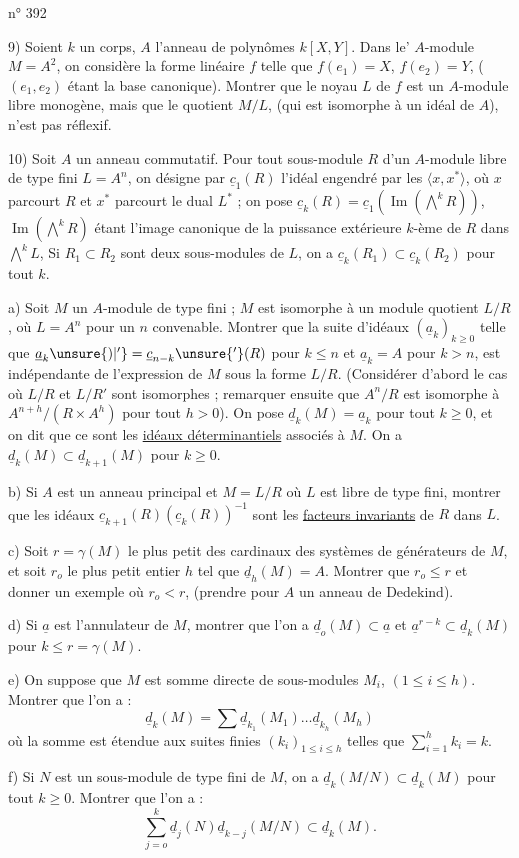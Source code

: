 \hfill n° 392

9) Soient $k$ un corps, $A$ l'anneau de polynômes $k[X,Y]$. Dans le' $A$-module $M=A^2$, on considère la forme linéaire $f$ telle que $f(e_1)=X$, $f(e_2)=Y$, ($(e_1,e_2)$ étant la base canonique). Montrer que le noyau $L$ de $f$ est un $A$-module libre monogène, mais que le quotient $M/L$, (qui est isomorphe à un idéal de $A$), n'est pas réflexif.

10) Soit $A$ un anneau commutatif. Pour tout sous-module $R$ d'un $A$-module libre de type fini $L=A^n$, on désigne par $\underline{c}_1(R)$ l'idéal engendré par les $\langle x,x^*\rangle$, où $x$ parcourt $R$ et $x^*$ parcourt le dual $L^*$ ; on pose $\underline{c}_k(R)=\underline{c}_1(\operatorname{Im}(\overset{k}{\bigwedge}R))$, $\operatorname{Im}(\overset{k}{\bigwedge}R)$ étant l'image canonique de la puissance extérieure $k$-ème de $R$ dans $\overset{k}{\bigwedge}L$, Si $R_1\subset R_2$ sont deux sous-modules de $L$, on a $\underline{c}_k(R_1)\subset \underline{c}_k(R_2)$ pour tout $k$.

a) Soit $M$ un $A$-module de type fini ; $M$ est isomorphe à un module quotient $L/R$, où $L=A^n$ pour un $n$ convenable. Montrer que la suite d'idéaux $(\underline{a}_k)_{k\geq0}$ telle que $\underline{a}_k\unsure{)|'}=\underline{c}_{n-k}\unsure{'}(R)$ pour $k\leq n$ et $\underline{a}_k=A$ pour $k>n$, est indépendante de l'expression de $M$ sous la forme $L/R$. (Considérer d'abord le cas où $L/R$ et $L/R'$ sont isomorphes ; remarquer ensuite que $A^n/R$ est isomorphe à $A^{n+h}/(R\times A^h)$ pour tout $h>0$). On pose $\underline{d}_k(M)=\underline{a}_k$ pour tout $k\geq0$, et on dit que ce sont les \uline{idéaux déterminantiels} associés à $M$. On a $\underline{d}_k(M)\subset \underline{d}_{k+1}(M)$ pour $k\geq0$.

b) Si $A$ est un anneau principal et $M=L/R$ où $L$ est libre de type fini, montrer que les idéaux $\underline{c}_{k+1}(R)(\underline{c}_k(R))^{-1}$ sont les \uline{facteurs invariants} de $R$ dans $L$.

c) Soit $r=\gamma(M)$ le plus petit des cardinaux des systèmes de générateurs de $M$, et soit $r_o$ le plus petit entier $h$ tel que $\underline{d}_h(M)=A$. Montrer que $r_o\leq r$ et donner un exemple où $r_o<r$, (prendre pour $A$ un anneau de Dedekind).

d) Si $\underline{a}$ est l'annulateur de $M$, montrer que l'on a $\underline{d}_o(M)\subset \underline{a}$ et $\underline{a}^{r-k}\subset \underline{d}_k(M)$ pour $k\leq r=\gamma(M)$.

e) On suppose que $M$ est somme directe de sous-modules $M_i$, $(1\leq i\leq h)$. Montrer que l'on a :
\[
\underline{d}_k(M)=\sum \underline{d}_{k_1}(M_1)\ldots \underline{d}_{k_h}(M_h)
\]
où la somme est étendue aux suites finies $(k_i)_{1\leq i\leq h}$ telles que $\sum_{i=1}^{h}k_i=k$.

f) Si $N$ est un sous-module de type fini de $M$, on a $\underline{d}_k(M/N)\subset \underline{d}_k(M)$ pour tout $k\geq0$. Montrer que l'on a :
\[
\sum_{j=o}^{k}\underline{d}_j(N)\underline{d}_{k-j}(M/N)\subset \underline{d}_k(M).
\]
